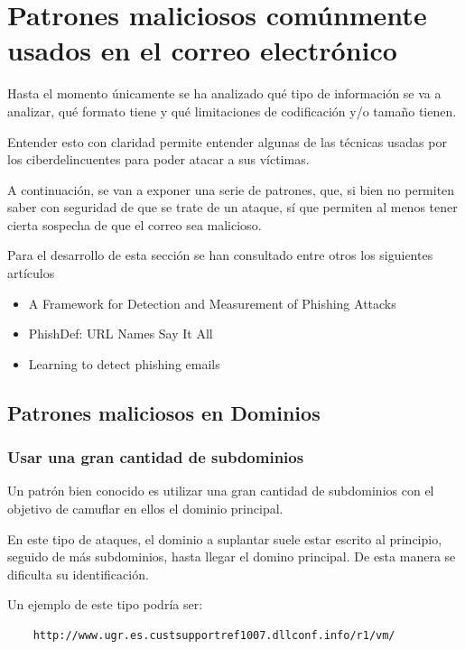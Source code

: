 \section{Patrones maliciosos comúnmente usados en el correo electrónico}
Hasta el momento únicamente se ha analizado qué tipo de información se va a analizar, qué formato tiene y qué limitaciones de codificación y/o tamaño tienen. 

Entender esto con claridad permite entender algunas de las técnicas usadas por los ciberdelincuentes para poder atacar a sus víctimas. 

A continuación, se van a exponer una serie de patrones, que, si bien no permiten saber con seguridad de que se trate de un ataque, sí que permiten al menos tener cierta sospecha de que el correo sea malicioso.

Para el desarrollo de esta sección se han consultado entre otros los siguientes artículos 

\begin{itemize}
    \item A Framework for Detection and Measurement of Phishing Attacks \cite{phishing1}
    \item PhishDef: URL Names Say It All \cite{phishing2}
    \item Learning to detect phishing emails \cite{phishing3}
\end{itemize}

\subsection{Patrones maliciosos en Dominios} \label{patrones_maliciosos}
\subsubsection{Usar una gran cantidad de subdominios}
Un patrón bien conocido es utilizar una gran cantidad de subdominios con el objetivo de camuflar en ellos el dominio principal. 

En este tipo de ataques, el dominio a suplantar suele estar escrito al principio, seguido de más subdominios, hasta llegar el domino principal. De esta manera se dificulta su identificación. 

Un ejemplo de este tipo podría ser: 

\begin{verbatim}
    http://www.ugr.es.custsupportref1007.dllconf.info/r1/vm/
\end{verbatim}

